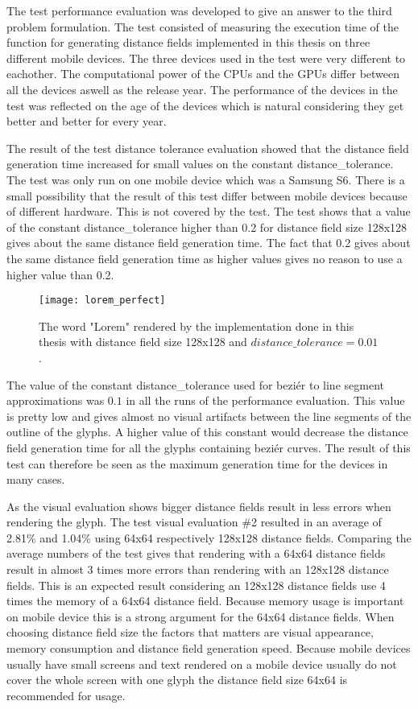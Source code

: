The test performance evaluation was developed to give an answer to the third problem formulation. The test consisted of measuring the execution time of the function for generating distance fields implemented in this thesis on three different mobile devices. The three devices used in the test were very different to eachother. The computational power of the CPUs and the GPUs differ between all the devices aswell as the release year. The performance of the devices in the test was reflected on the age of the devices which is natural considering they get better and better for every year. 

The result of the test distance tolerance evaluation showed that the distance field generation time increased for small values on the constant distance\_tolerance. The test was only run on one mobile device which was a Samsung S6. There is a small possibility that the result of this test differ between mobile devices because of different hardware. This is not covered by the test. The test shows that a value of the constant distance\_tolerance higher than 0.2 for distance field size 128x128 gives about the same distance field generation time. The fact that 0.2 gives about the same distance field generation time as higher values gives no reason to use a higher value than 0.2.

\begin{figure}[H]
\texttt{[image: lorem\_perfect]}
\caption{The word "Lorem" rendered by the implementation done in this thesis with distance field size 128x128 and $distance\_tolerance=0.01$.}
\label{fig:isLine}
\end{figure}

The value of the constant distance\_tolerance used for beziér to line segment approximations was $0.1$ in all the runs of the performance evaluation. This value is pretty low and gives almost no visual artifacts between the line segments of the outline of the glyphs. A higher value of this constant would decrease the distance field generation time for all the glyphs containing beziér curves. The result of this test can therefore be seen as the maximum generation time for the devices in many cases.

As the visual evaluation shows bigger distance fields result in less errors when rendering the glyph. The test visual evaluation \#2 resulted in an average of 2.81\% and 1.04\% using 64x64 respectively 128x128 distance fields. Comparing the average numbers of the test gives that rendering with a 64x64 distance fields result in almost 3 times more errors than rendering with an 128x128 distance fields. This is an expected result considering an 128x128 distance fields use 4 times the memory of a 64x64 distance field. Because memory usage is important on mobile device this is a strong argument for the 64x64 distance fields. When choosing distance field size the factors that matters are visual appearance, memory consumption and distance field generation speed. Because mobile devices usually have small screens and text rendered on a mobile device usually do not cover the whole screen with one glyph the distance field size 64x64 is recommended for usage.

